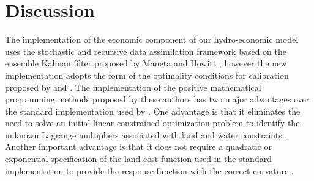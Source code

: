 \section{Discussion}

The implementation of the economic component of our hydro-economic model uses the stochastic and recursive data assimilation framework based on the ensemble Kalman filter proposed by Maneta and Howitt \citet{Maneta2014}, however the new implementation adopts the form of the optimality conditions for calibration proposed by \citet{Merel2011b} and \citet{Garnache2017}. The implementation of the positive mathematical programming methods proposed by these authors has two major advantages over the standard implementation used by \citet{Maneta2014}. One advantage is that it eliminates the need to solve an initial linear constrained optimization problem to identify the unknown Lagrange multipliers associated with land and water constraints \citep{Howitt1995}. Another important advantage is that it does not require a quadratic or exponential specification of the land cost function used in the standard implementation to provide the response function with the correct curvature \citep{Howitt1995, Howitt2012}.  

